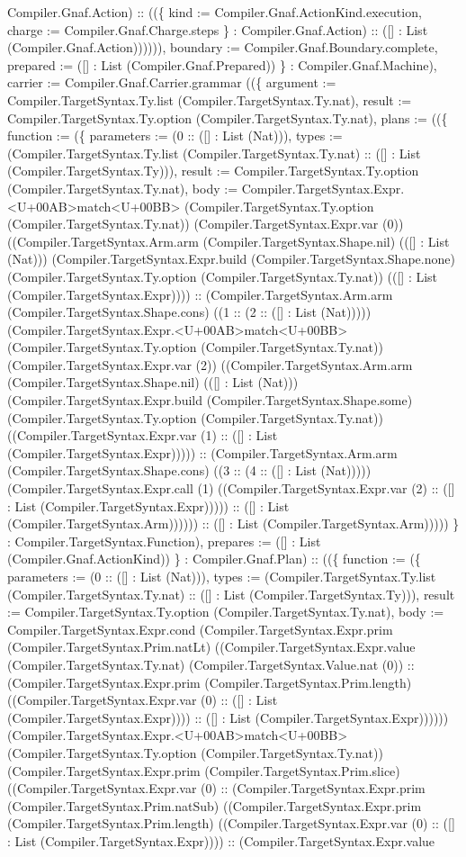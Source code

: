 \documentclass[11pt]{article}
\begin{document}
Compiler.Gnaf.Action) :: ((\{ kind := Compiler.Gnaf.ActionKind.execution, charge := Compiler.Gnaf.Charge.steps \} : Compiler.Gnaf.Action) :: ([] : List (Compiler.Gnaf.Action)))))), boundary := Compiler.Gnaf.Boundary.complete, prepared := ([] : List (Compiler.Gnaf.Prepared)) \} : Compiler.Gnaf.Machine), carrier := Compiler.Gnaf.Carrier.grammar ((\{ argument := Compiler.TargetSyntax.Ty.list (Compiler.TargetSyntax.Ty.nat), result := Compiler.TargetSyntax.Ty.option (Compiler.TargetSyntax.Ty.nat), plans := ((\{ function := (\{ parameters := (0 :: ([] : List (Nat))), types := (Compiler.TargetSyntax.Ty.list (Compiler.TargetSyntax.Ty.nat) :: ([] : List (Compiler.TargetSyntax.Ty))), result := Compiler.TargetSyntax.Ty.option (Compiler.TargetSyntax.Ty.nat), body := Compiler.TargetSyntax.Expr.<U+00AB>match<U+00BB> (Compiler.TargetSyntax.Ty.option (Compiler.TargetSyntax.Ty.nat)) (Compiler.TargetSyntax.Expr.var (0)) ((Compiler.TargetSyntax.Arm.arm (Compiler.TargetSyntax.Shape.nil) (([] : List (Nat))) (Compiler.TargetSyntax.Expr.build (Compiler.TargetSyntax.Shape.none) (Compiler.TargetSyntax.Ty.option (Compiler.TargetSyntax.Ty.nat)) (([] : List (Compiler.TargetSyntax.Expr)))) :: (Compiler.TargetSyntax.Arm.arm (Compiler.TargetSyntax.Shape.cons) ((1 :: (2 :: ([] : List (Nat))))) (Compiler.TargetSyntax.Expr.<U+00AB>match<U+00BB> (Compiler.TargetSyntax.Ty.option (Compiler.TargetSyntax.Ty.nat)) (Compiler.TargetSyntax.Expr.var (2)) ((Compiler.TargetSyntax.Arm.arm (Compiler.TargetSyntax.Shape.nil) (([] : List (Nat))) (Compiler.TargetSyntax.Expr.build (Compiler.TargetSyntax.Shape.some) (Compiler.TargetSyntax.Ty.option (Compiler.TargetSyntax.Ty.nat)) ((Compiler.TargetSyntax.Expr.var (1) :: ([] : List (Compiler.TargetSyntax.Expr))))) :: (Compiler.TargetSyntax.Arm.arm (Compiler.TargetSyntax.Shape.cons) ((3 :: (4 :: ([] : List (Nat))))) (Compiler.TargetSyntax.Expr.call (1) ((Compiler.TargetSyntax.Expr.var (2) :: ([] : List (Compiler.TargetSyntax.Expr))))) :: ([] : List (Compiler.TargetSyntax.Arm)))))) :: ([] : List (Compiler.TargetSyntax.Arm))))) \} : Compiler.TargetSyntax.Function), prepares := ([] : List (Compiler.Gnaf.ActionKind)) \} : Compiler.Gnaf.Plan) :: ((\{ function := (\{ parameters := (0 :: ([] : List (Nat))), types := (Compiler.TargetSyntax.Ty.list (Compiler.TargetSyntax.Ty.nat) :: ([] : List (Compiler.TargetSyntax.Ty))), result := Compiler.TargetSyntax.Ty.option (Compiler.TargetSyntax.Ty.nat), body := Compiler.TargetSyntax.Expr.cond (Compiler.TargetSyntax.Expr.prim (Compiler.TargetSyntax.Prim.natLt) ((Compiler.TargetSyntax.Expr.value (Compiler.TargetSyntax.Ty.nat) (Compiler.TargetSyntax.Value.nat (0)) :: (Compiler.TargetSyntax.Expr.prim (Compiler.TargetSyntax.Prim.length) ((Compiler.TargetSyntax.Expr.var (0) :: ([] : List (Compiler.TargetSyntax.Expr)))) :: ([] : List (Compiler.TargetSyntax.Expr)))))) (Compiler.TargetSyntax.Expr.<U+00AB>match<U+00BB> (Compiler.TargetSyntax.Ty.option (Compiler.TargetSyntax.Ty.nat)) (Compiler.TargetSyntax.Expr.prim (Compiler.TargetSyntax.Prim.slice) ((Compiler.TargetSyntax.Expr.var (0) :: (Compiler.TargetSyntax.Expr.prim (Compiler.TargetSyntax.Prim.natSub) ((Compiler.TargetSyntax.Expr.prim (Compiler.TargetSyntax.Prim.length) ((Compiler.TargetSyntax.Expr.var (0) :: ([] : List (Compiler.TargetSyntax.Expr)))) :: (Compiler.TargetSyntax.Expr.value 
\end{document}
